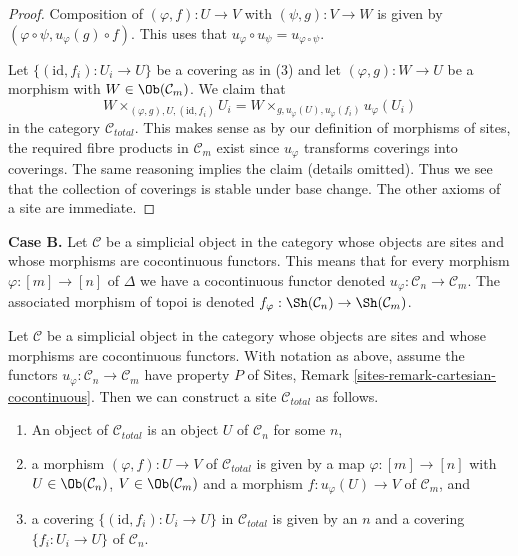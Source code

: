 \begin{proof}
Composition of $(\varphi, f) : U \to V$ with $(\psi, g) : V \to W$
is given by $(\varphi \circ \psi, u_\varphi(g) \circ f)$.
This uses that $u_\varphi \circ u_\psi = u_{\varphi \circ \psi}$.

\medskip\noindent
Let $\{(\text{id}, f_i) :  U_i \to U\}$ be a covering as in (3)
and let $(\varphi, g) : W \to U$ be a morphism with
$W \in \Ob(\mathcal{C}_m)$. We claim that
$$
W \times_{(\varphi, g), U, (\text{id}, f_i)} U_i =
W \times_{g, u_\varphi(U), u_\varphi(f_i)} u_\varphi(U_i)
$$
in the category $\mathcal{C}_{total}$. This makes sense as by our
definition of morphisms of sites, the required fibre products
in $\mathcal{C}_m$ exist since $u_\varphi$ transforms coverings into
coverings. The same reasoning implies the claim (details omitted).
Thus we see that the collection of coverings is stable under base
change. The other axioms of a site are immediate.
\end{proof}

\noindent
{\bf Case B.}
Let $\mathcal{C}$ be a simplicial object in the category whose objects are
sites and whose morphisms are cocontinuous functors. This means that for
every morphism $\varphi : [m] \to [n]$ of $\Delta$ we have a cocontinuous
functor denoted $u_\varphi : \mathcal{C}_n \to \mathcal{C}_m$. The associated
morphism of topoi is denoted
$f_\varphi : \Sh(\mathcal{C}_n) \to \Sh(\mathcal{C}_m)$.

\begin{lemma}
\label{lemma-simplicial-cocontinuous-site}
Let $\mathcal{C}$ be a simplicial object in the category whose objects are
sites and whose morphisms are cocontinuous functors. With notation as above,
assume the functors $u_\varphi : \mathcal{C}_n \to \mathcal{C}_m$
have property $P$ of Sites, Remark \ref{sites-remark-cartesian-cocontinuous}.
Then we can construct a site $\mathcal{C}_{total}$ as follows.
\begin{enumerate}
\item An object of $\mathcal{C}_{total}$ is an object $U$ of
$\mathcal{C}_n$ for some $n$,
\item a morphism $(\varphi, f) : U \to V$ of $\mathcal{C}_{total}$
is given by a map $\varphi : [m] \to [n]$ with
$U \in \Ob(\mathcal{C}_n)$, $V \in \Ob(\mathcal{C}_m)$
and a morphism $f : u_\varphi(U) \to V$ of $\mathcal{C}_m$, and
\item a covering $\{(\text{id}, f_i) :  U_i \to U\}$ in $\mathcal{C}_{total}$
is given by an $n$ and a covering $\{f_i : U_i \to U\}$
of $\mathcal{C}_n$.
\end{enumerate}
\end{lemma}

